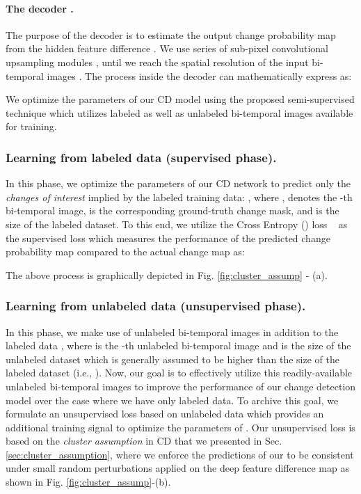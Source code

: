 \documentclass[runningheads]{llncs}
\begin{document}
\paragraph{The decoder .} The purpose of the decoder is to estimate the output change probability map  from the hidden feature difference . We use series of sub-pixel convolutional upsampling modules \cite{shi2016real}, until we reach the spatial resolution of the input bi-temporal images . The process inside the decoder can mathematically express as:


We optimize the parameters of our CD model  using the proposed semi-supervised technique which utilizes labeled as well as unlabeled bi-temporal images available for training. 

\subsubsection{Learning from labeled data (supervised phase).} In this phase, we optimize the parameters of our CD network  to predict only the \textit{changes of interest} implied by the labeled training data: , where ,  denotes the -th bi-temporal image,  is the corresponding ground-truth change mask, and  is the size of the labeled dataset.  To this end, we utilize the Cross Entropy () loss ~\cite{murphy2012machine} as the supervised loss  which measures the performance of the predicted change probability map  compared to the actual change map  as:

The above process is graphically depicted in Fig. \ref{fig:cluster_assump} - (a).

\subsubsection{Learning from unlabeled data (unsupervised phase).} In this phase, we make use of unlabeled bi-temporal images  in addition to the labeled data , where  is the -th unlabeled bi-temporal image and  is the size of the unlabeled dataset which is generally assumed to be higher than the size of the labeled dataset (i.e., ). Now, our goal is to effectively utilize this readily-available unlabeled bi-temporal images to improve the performance of our change detection model  over the case where we have only labeled data. To archive this goal, we formulate an unsupervised loss  based on unlabeled data which provides an additional training signal to optimize the parameters of . Our unsupervised loss is based on the \textit{cluster assumption} in CD that we presented in Sec. \ref{sec:cluster_assumption}, where we enforce the predictions of our  to be consistent under small random perturbations applied on the deep feature difference map  as shown in Fig. \ref{fig:cluster_assump}-(b).
\end{document}
